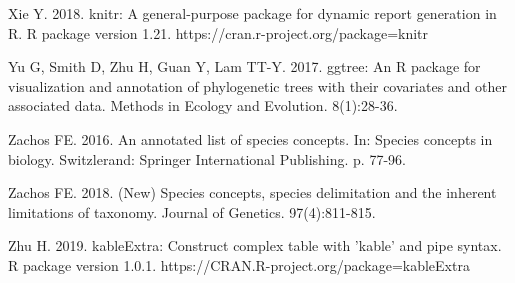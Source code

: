 Xie Y. 2018. knitr: A general-purpose package for dynamic report generation in R. R package version 1.21. https://cran.r-project.org/package=knitr

Yu G, Smith D, Zhu H, Guan Y, Lam TT-Y. 2017. ggtree: An R package for visualization and annotation of phylogenetic trees with their covariates and other associated data. Methods in Ecology and Evolution. 8(1):28-36.

Zachos FE. 2016. An annotated list of species concepts. In: Species concepts in biology. Switzlerand: Springer International Publishing. p. 77-96.

Zachos FE. 2018. (New) Species concepts, species delimitation and the inherent limitations of taxonomy. Journal of Genetics. 97(4):811-815.

Zhu H. 2019. kableExtra: Construct complex table with 'kable' and pipe syntax. R package version 1.0.1. https://CRAN.R-project.org/package=kableExtra

\setlength{\parindent}{0em}
\setlength{\leftskip}{0em}
\setlength{\parskip}{6pt}
\doublespacing
